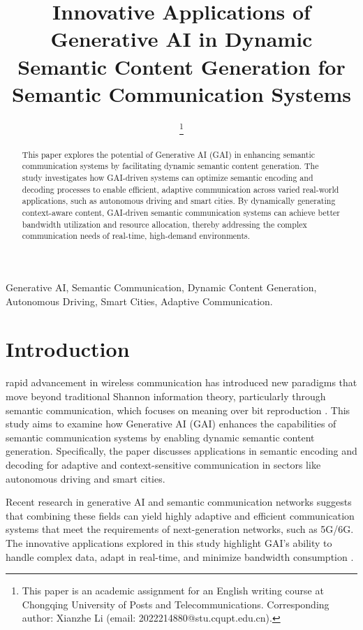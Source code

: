 \documentclass[journal,transmag]{IEEEtran}
\title{Innovative Applications of Generative AI in Dynamic Semantic Content Generation for Semantic Communication Systems}
\author{\IEEEauthorblockN{Xianzhe Li\IEEEauthorrefmark{1}}
\IEEEauthorblockA{\IEEEauthorrefmark{1}School of Communication and Information Engineering, Chongqing University of Posts and Telecommunications, Chongqing, China \\ Email: 2022214880@stu.cqupt.edu.cn}
\thanks{This paper is an academic assignment for an English writing course at Chongqing University of Posts and Telecommunications. Corresponding author: Xianzhe Li (email: 2022214880@stu.cqupt.edu.cn).}}
\begin{document}
\maketitle

\begin{abstract}
This paper explores the potential of Generative AI (GAI) in enhancing semantic communication systems by facilitating dynamic semantic content generation. The study investigates how GAI-driven systems can optimize semantic encoding and decoding processes to enable efficient, adaptive communication across varied real-world applications, such as autonomous driving and smart cities. By dynamically generating context-aware content, GAI-driven semantic communication systems can achieve better bandwidth utilization and resource allocation, thereby addressing the complex communication needs of real-time, high-demand environments.
\end{abstract}

\begin{IEEEkeywords}
Generative AI, Semantic Communication, Dynamic Content Generation, Autonomous Driving, Smart Cities, Adaptive Communication.
\end{IEEEkeywords}

\IEEEpeerreviewmaketitle

\section{Introduction}
 rapid advancement in wireless communication has introduced new paradigms that move beyond traditional Shannon information theory, particularly through semantic communication, which focuses on meaning over bit reproduction \cite{9530497}. This study aims to examine how Generative AI (GAI) enhances the capabilities of semantic communication systems by enabling dynamic semantic content generation. Specifically, the paper discusses applications in semantic encoding and decoding for adaptive and context-sensitive communication in sectors like autonomous driving and smart cities.

Recent research in generative AI \cite{Radford2018ImprovingLU} and semantic communication networks \cite{10614204,10447237} suggests that combining these fields can yield highly adaptive and efficient communication systems that meet the requirements of next-generation networks, such as 5G/6G. The innovative applications explored in this study highlight GAI’s ability to handle complex data, adapt in real-time, and minimize bandwidth consumption \cite{liu2024semanticcommunicationsartificialintelligence}.
\end{document}
